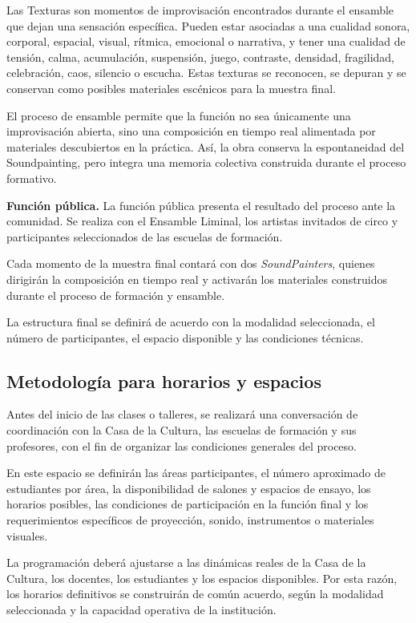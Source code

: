 \documentclass[11pt,a4paper]{article}
\begin{document}
Las Texturas son momentos de improvisación encontrados durante el ensamble que dejan una sensación específica. Pueden estar asociadas a una cualidad sonora, corporal, espacial, visual, rítmica, emocional o narrativa, y tener una cualidad de tensión, calma, acumulación, suspensión, juego, contraste, densidad, fragilidad, celebración, caos, silencio o escucha. Estas texturas se reconocen, se depuran y se conservan como posibles materiales escénicos para la muestra final.

El proceso de ensamble permite que la función no sea únicamente una improvisación abierta, sino una composición en tiempo real alimentada por materiales descubiertos en la práctica. Así, la obra conserva la espontaneidad del Soundpainting, pero integra una memoria colectiva construida durante el proceso formativo.

\textbf{Función pública.} La función pública presenta el resultado del proceso ante la comunidad. Se realiza con el Ensamble Liminal, los artistas invitados de circo y participantes seleccionados de las escuelas de formación.

Cada momento de la muestra final contará con dos \textit{SoundPainters}, quienes dirigirán la composición en tiempo real y activarán los materiales construidos durante el proceso de formación y ensamble.

La estructura final se definirá de acuerdo con la modalidad seleccionada, el número de participantes, el espacio disponible y las condiciones técnicas.

\subsection{Metodología para horarios y espacios}

Antes del inicio de las clases o talleres, se realizará una conversación de coordinación con la Casa de la Cultura, las escuelas de formación y sus profesores, con el fin de organizar las condiciones generales del proceso.

En este espacio se definirán las áreas participantes, el número aproximado de estudiantes por área, la disponibilidad de salones y espacios de ensayo, los horarios posibles, las condiciones de participación en la función final y los requerimientos específicos de proyección, sonido, instrumentos o materiales visuales.

La programación deberá ajustarse a las dinámicas reales de la Casa de la Cultura, los docentes, los estudiantes y los espacios disponibles. Por esta razón, los horarios definitivos se construirán de común acuerdo, según la modalidad seleccionada y la capacidad operativa de la institución.
\end{document}
